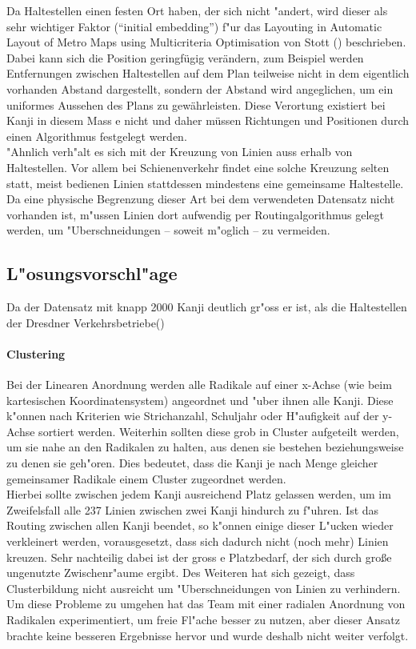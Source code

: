 Da Haltestellen einen festen Ort haben, der sich nicht "andert, wird dieser als sehr wichtiger Faktor ("`initial embedding"') f"ur das Layouting in Automatic Layout of Metro Maps using Multicriteria Optimisation von Stott (\cite{automaticlayoutmetro08}) beschrieben. Dabei kann sich die Position geringfügig verändern, zum Beispiel werden Entfernungen zwischen Haltestellen auf dem Plan teilweise nicht in dem eigentlich vorhanden Abstand dargestellt, sondern der Abstand wird angeglichen, um ein uniformes Aussehen des Plans zu gewährleisten. Diese Verortung existiert bei Kanji in diesem Mass e nicht und daher müssen Richtungen und Positionen durch einen Algorithmus festgelegt werden. \\
"Ahnlich verh"alt es sich mit der Kreuzung von Linien auss erhalb von Haltestellen. Vor allem bei Schienenverkehr findet eine solche Kreuzung selten statt, meist bedienen Linien stattdessen mindestens eine gemeinsame Haltestelle. Da eine physische Begrenzung dieser Art bei dem verwendeten Datensatz nicht vorhanden ist, m"ussen Linien dort aufwendig per Routingalgorithmus gelegt werden, um "Uberschneidungen – soweit m"oglich – zu vermeiden.

\subsection{L"osungsvorschl"age}
Da der Datensatz mit knapp 2000 Kanji deutlich gr"oss er ist, als die Haltestellen der Dresdner Verkehrsbetriebe(\cite{dvbag})
\paragraph{Clustering}
Bei der Linearen Anordnung werden alle Radikale auf einer x-Achse (wie beim kartesischen Koordinatensystem) angeordnet und "uber ihnen alle Kanji. Diese k"onnen nach Kriterien wie Strichanzahl, Schuljahr oder H"aufigkeit auf der y-Achse sortiert werden. Weiterhin sollten diese grob in Cluster aufgeteilt werden, um sie nahe an den Radikalen zu halten, aus denen sie bestehen beziehungsweise zu denen sie geh"oren. Dies bedeutet, dass die Kanji je nach Menge gleicher gemeinsamer Radikale einem Cluster zugeordnet werden. \\
Hierbei sollte zwischen jedem Kanji ausreichend Platz gelassen werden, um im Zweifelsfall alle 237 Linien zwischen zwei Kanji hindurch zu f"uhren. Ist das Routing zwischen allen Kanji beendet, so k"onnen einige dieser L"ucken wieder verkleinert werden, vorausgesetzt, dass sich dadurch nicht (noch mehr) Linien kreuzen. 
Sehr nachteilig dabei ist der gross e Platzbedarf, der sich durch große ungenutzte Zwischenr"aume ergibt. Des Weiteren hat sich gezeigt, dass Clusterbildung nicht ausreicht um "Uberschneidungen von Linien zu verhindern. \\
Um diese Probleme zu umgehen hat das Team mit einer radialen Anordnung von Radikalen experimentiert, um freie Fl"ache besser zu nutzen, aber dieser Ansatz brachte keine besseren Ergebnisse hervor und wurde deshalb nicht weiter verfolgt.
